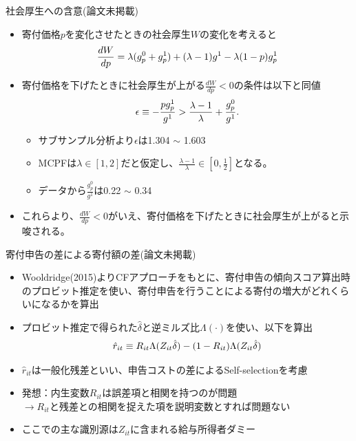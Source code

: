 \documentclass[dvipdfmx,10pt]{beamer}
\begin{document}
\begin{frame}{社会厚生への含意(論文未掲載)}
	\begin{itemize}
		\item 寄付価格$p$を変化させたときの社会厚生$W$の変化を考えると
		\begin{align}
			\frac{dW}{dp} =\lambda (g_p^0+g_p^1)+(\lambda-1)g^1-\lambda(1-p)g_p^1\notag
		\end{align}
		\item 寄付価格を下げたときに社会厚生が上がる$\frac{dW}{dp}<0$の条件は以下と同値
		\begin{align}
			\epsilon\equiv -\frac{pg_p^1}{g^1}>\frac{\lambda-1}{\lambda}+\frac{g_p^0}{g^1}\notag.
		\end{align}
		\begin{itemize}
		\item サブサンプル分析より$\epsilon$は1.304 $\sim$ 1.603
		\item MCPFは$\lambda\in[1,2]$だと仮定し、$\frac{\lambda-1}{\lambda}\in[0,\frac12]$となる。
		\item データから$\frac{g_p^0}{g^1}$は0.22 $\sim$ 0.34
		\end{itemize}
		\item これらより、$\frac{dW}{dp}<0$がいえ、寄付価格を下げたときに社会厚生が上がると示唆される。
	\end{itemize}
\end{frame}



\begin{frame}{寄付申告の差による寄付額の差(論文未掲載)}
	\begin{itemize}
		\item Wooldridge(2015)よりCFアプローチをもとに、寄付申告の傾向スコア算出時のプロビット推定を使い、寄付申告を行うことによる寄付の増大がどれくらいになるかを算出
		\item プロビット推定で得られた$\hat{\delta}$と逆ミルズ比$\Lambda(\cdot)$を使い、以下を算出
		\begin{align}
			\hat{r}_{it}\equiv R_{it}\Lambda(Z_{it}\hat{\delta})-(1-R_{it})\Lambda(Z_{it}\hat{\delta})\notag
		\end{align}
		\item $\hat{r}_{it}$は一般化残差といい、申告コストの差によるSelf-selectionを考慮
		\item 発想：内生変数$R_{it}$は誤差項と相関を持つのが問題\\
		\qquad$\to$$R_{it}$と残差との相関を捉えた項を説明変数とすれば問題ない
		\item ここでの主な識別源は$Z_{it}$に含まれる給与所得者ダミー
	\end{itemize}
\end{frame}
\end{document}
